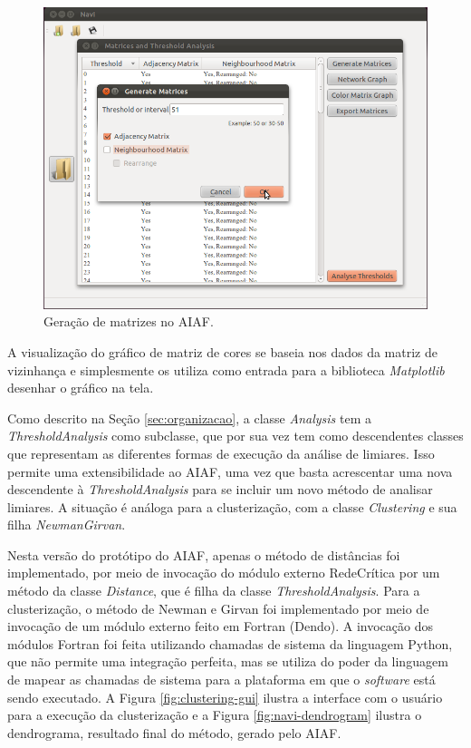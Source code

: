 \begin{figure}
\centering
\includegraphics[scale=0.38]{generate-matrices}
\caption{Geração de matrizes no AIAF.}
\label{fig:generate-matrices}
\end{figure}

A visualização do gráfico de matriz de cores se baseia nos dados da matriz de vizinhança e simplesmente os utiliza como entrada para a biblioteca
\textit{Matplotlib} desenhar o gráfico na tela.

Como descrito na Seção \ref{sec:organizacao}, a classe \textit{Analysis} tem a \textit{ThresholdAnalysis} como subclasse,
que por sua vez tem como descendentes classes que representam as diferentes formas de execução da análise de limiares. Isso permite uma extensibilidade
ao AIAF, uma vez que basta acrescentar uma nova descendente à \textit{ThresholdAnalysis} para se incluir um novo método de analisar limiares. A situação
é análoga para a clusterização, com a classe \textit{Clustering} e sua filha \textit{NewmanGirvan}.

Nesta versão do protótipo do AIAF, apenas o método de distâncias foi implementado, por meio de invocação do módulo externo RedeCrítica por um método da
classe \textit{Distance}, que é filha da classe \textit{ThresholdAnalysis}. Para a clusterização, o método de Newman e Girvan foi implementado por meio
de invocação de um módulo externo feito em Fortran (Dendo). A invocação dos módulos Fortran foi feita utilizando chamadas de sistema da linguagem Python,
que não permite uma integração perfeita, mas se utiliza do poder da linguagem de mapear as chamadas de sistema para a plataforma em que o \textit{software}
está sendo executado. A Figura \ref{fig:clustering-gui} ilustra a interface com o usuário para a execução da clusterização e a Figura \ref{fig:navi-dendrogram}
ilustra o dendrograma, resultado final do método, gerado pelo AIAF.

